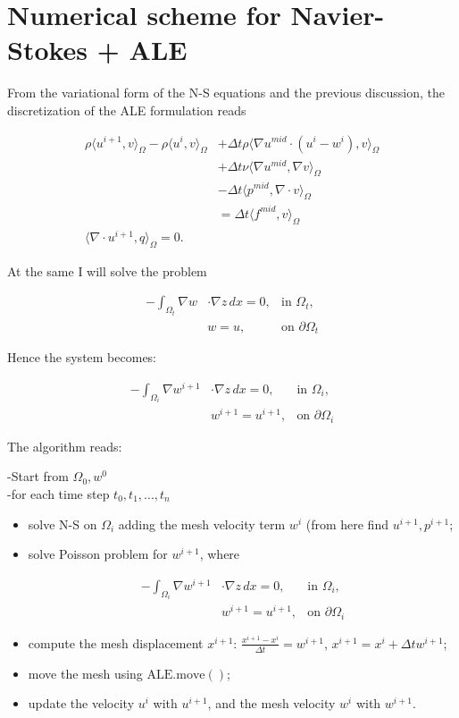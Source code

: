 \documentclass[11pt,a4paper,titlepage]{report}
\begin{document}
\section{Numerical scheme for Navier-Stokes + ALE}
From the variational form of the N-S equations and the previous discussion, the discretization of the ALE formulation reads

\[
\begin{aligned}
\rho \langle u^{i+1},v \rangle_\Omega - \rho \langle u^i, v \rangle_\Omega & + \Delta t \rho \langle \nabla u^{mid} \cdot (u^i -w^i)  ,v \rangle_\Omega \\
& + \Delta t \nu \langle \nabla u^{mid}, \nabla v \rangle_\Omega \\
& - \Delta t \langle p^{mid} , \nabla \cdot v \rangle_\Omega \\
& = \Delta t \langle f^{mid} ,v \rangle_\Omega \\
\langle \nabla \cdot u^{i+1},q \rangle_\Omega = 0.
\end{aligned}
\]

At the same I will solve the problem

\[
\begin{aligned}
-  \int_{\Omega_t} \nabla w & \cdot \nabla z \, dx = 0, & \text{in } \Omega_t, \\
& w = u, & \text{on } \partial \Omega_t
\end{aligned}
\]

Hence the system becomes:

\[
\begin{aligned}
-  \int_{\Omega_i} \nabla w^{i+1} & \cdot \nabla z \, dx = 0, & \text{in } \Omega_i, \\
& w^{i+1} = u^{i+1}, & \text{on } \partial \Omega_i
\end{aligned}
\]

The algorithm reads:

-Start from $\Omega_0, w^0$ \\
-for each time step $t_0, t_1, ..., t_n$
\begin{itemize}
\item solve N-S on $\Omega_i$ adding the mesh velocity term $w^i$ (from here find $u^{i+1}, p^{i+1}$;
\item solve Poisson problem for $w^{i+1}$, where

\[
\begin{aligned}
-  \int_{\Omega_i} \nabla w^{i+1} & \cdot \nabla z \, dx = 0, & \text{in } \Omega_i, \\
& w^{i+1} = u^{i+1}, & \text{on } \partial \Omega_i
\end{aligned}
\]

\item compute the mesh displacement $x^{i+1}$: $\frac{x^{i+1} - x^{i}}{\Delta t} = w^{i+1}$, $x^{i+1} = x^{i} + \Delta t w^{i+1}$;
\item move the mesh using $\mathrm{ALE.move()}$;
\item update the velocity $u^i$ with $u^{i+1}$, and the mesh velocity $w^i$ with $w^{i+1}$.

\end{itemize}
\end{document}
